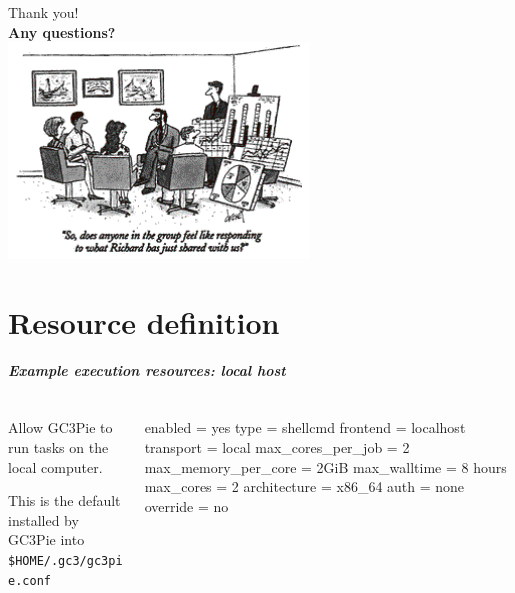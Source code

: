 \documentclass[english,serif,mathserif,usenames,dvipsnames]{beamer}
\begin{document}
\begin{frame}
  \begin{center}
    {\Huge Thank you!}
    \\[2em]
    \textbf{Any questions?}
    \\[0.5em]
    \includegraphics[width=0.6\textwidth]{fig/questions.png}
  \end{center}
\end{frame}


\part{Resource definition}
\begin{frame}[fragile,label=resources]
  \frametitle{Example execution resources: local host}
  \begin{columns}[t]
    \begin{column}{0.5\textwidth}
      Allow GC3Pie to run tasks on the local computer.

      \+ This is the default installed by GC3Pie
      into \lstinline|$HOME/.gc3/gc3pie.conf| %
    \end{column}
    \begin{column}{0.5\textwidth}
  \begin{stdout}
enabled = yes
type = shellcmd
frontend = localhost
transport = local
max_cores_per_job = 2
max_memory_per_core = 2GiB
max_walltime = 8 hours
max_cores = 2
architecture = x86_64
auth = none
override = no
\end{stdout}
    \end{column}
  \end{columns}
\end{frame}
\end{document}
